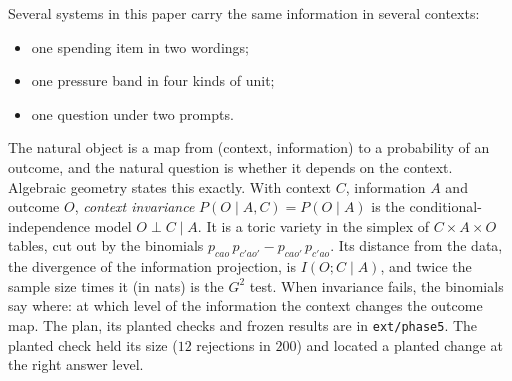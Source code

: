 \documentclass[11pt]{article}
\theoremstyle{definition}
\theoremstyle{remark}
\begin{document}
Several systems in this paper carry the same information in several contexts:
\begin{itemize}[leftmargin=*,nosep]
\item one spending item in two wordings;
\item one pressure band in four kinds of unit;
\item one question under two prompts.
\end{itemize}
The natural object is a map from (context, information) to a probability of an outcome, and the natural question is whether it depends
on the context. Algebraic geometry states this exactly. With context $C$, information $A$ and outcome $O$, \emph{context invariance}
$P(O\mid A,C)=P(O\mid A)$ is the conditional-independence model $O\perp C\mid A$. It is a toric variety in the simplex of
$C\times A\times O$ tables, cut out by the binomials $p_{cao}\,p_{c'ao'}-p_{cao'}\,p_{c'ao}$. Its distance from the data, the divergence
of the information projection, is $I(O;C\mid A)$, and twice the sample size times it (in nats) is the $G^2$ test. When invariance fails,
the binomials say where: at which level of the information the context changes the outcome map. The plan, its planted checks and
frozen results are in \texttt{ext/phase5}. The planted check held its size ($12$ rejections in $200$) and located a planted change at
the right answer level.
\end{document}
